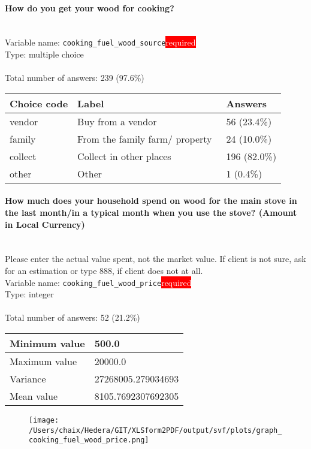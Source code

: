 \documentclass[11.5pt, a4paper]{scrartcl}
\begin{document}
\paragraph{How do you get your wood for cooking?}
\  \\Variable name: \texttt{cooking\_fuel\_wood\_source}\hfill\colorbox{red}{\small{\textcolor{white}{required}}}\\
 Type: multiple choice\\
\\Total number of answers: 239 (97.6\%)
\\[0.2em] \begin{tabular}{p{4cm}|p{8cm}|p{3cm}}
Choice code & Label & Answers \\
\hline
vendor & Buy from a vendor & \cellcolor{color1}56 (23.4\%)\\
\cellcolor{mygray} family & \cellcolor{mygray}From the family farm/ property  & \cellcolor{color0}24 (10.0\%)\\
collect & Collect in other places& \cellcolor{color4}196 (82.0\%)\\
\cellcolor{mygray} other & \cellcolor{mygray}Other  & \cellcolor{color0}1 (0.4\%)\\
\end{tabular}
\paragraph{How much  does your household spend on wood for the main stove in the last month/in a typical month when you use the stove? (Amount in Local Currency) }
\ \\ {\small Please enter the actual value spent, not the market value. If client is not sure, ask for an estimation or type 888, if client does not at all. }
\  \\Variable name: \texttt{cooking\_fuel\_wood\_price}\hfill\colorbox{red}{\small{\textcolor{white}{required}}}\\
 Type: integer\\
\\Total number of answers: 52 (21.2\%)
\\[0.2em] \begin{tabular}{p{4cm}|p{8cm}}
Minimum value &500.0 \\
\hline
\cellcolor{mygray} Maximum value & \cellcolor{mygray}20000.0 \\
\hline
Variance &27268005.279034693 \\
\hline
\cellcolor{mygray} Mean value & \cellcolor{mygray}8105.7692307692305 \\
\hline
\end{tabular}
\begin{figure}[H]
\centering
\texttt{[image: /Users/chaix/Hedera/GIT/XLSform2PDF/output/svf/plots/graph\_cooking\_fuel\_wood\_price.png]}
\end{figure}
\end{document}
